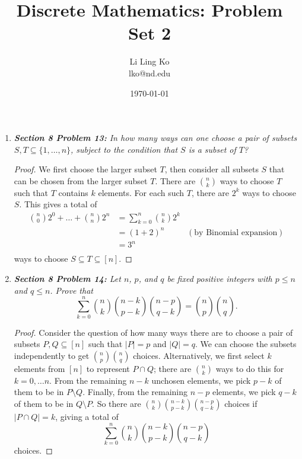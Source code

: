 \documentclass{article}
\begin{document}
\title{Discrete Mathematics: Problem Set 2}
\author{Li Ling Ko\\ lko@nd.edu}
\date{\today}
\maketitle

\begin{enumerate}[label={\bf Q\arabic*:}]
  \item \it \textbf{Section 8 Problem 13:} In how many ways can one choose
    a pair of subsets $S,T\subseteq\{1,\ldots,n\}$, subject to the
    condition that $S$ is a subset of $T$?

    \begin{proof}
      We first choose the larger subset $T$, then consider all subsets $S$
      that can be chosen from the larger subset $T$. There are
      $\binom{n}{k}$ ways to choose $T$ such that $T$ contains $k$
      elements. For each such $T$, there are $2^k$ ways to choose $S$. This
      gives a total of
      \begin{align*}
        \binom{n}{0}2^0+\ldots+\binom{n}{n}2^n
          &=\sum_{k=0}^n\binom{n}{k}2^k\\
          &=(1+2)^n &(\text{by Binomial expansion})\\
          &=3^n\\
      \end{align*}
      ways to choose $S\subseteq T\subseteq[n]$.
    \end{proof}

  \item \it \textbf{Section 8 Problem 14:} Let $n$, $p$, and $q$ be fixed
    positive integers with $p\leq n$ and $q\leq n$. Prove that
    \[\sum_{k=0}^n \binom{n}{k}\binom{n-k}{p-k}\binom{n-p}{q-k}
    =\binom{n}{p}\binom{n}{q}.\]

    \begin{proof}
      Consider the question of how many ways there are to choose a pair of
      subsets $P,Q\subseteq[n]$ such that $|P|=p$ and $|Q|=q$. We can
      choose the subsets independently to get $\binom{n}{p}\binom{n}{q}$
      choices. Alternatively, we first select $k$ elements from $[n]$ to
      represent $P\cap Q$; there are $\binom{n}{k}$ ways to do this for
      $k=0,\ldots n$. From the remaining $n-k$ unchosen elements, we pick
      $p-k$ of them to be in $P\setminus Q$. Finally, from the remaining
      $n-p$ elements, we pick $q-k$ of them to be in $Q\setminus P$. So
      there are $\binom{n}{k}\binom{n-k}{p-k}\binom{n-p}{q-k}$ choices
      if $|P\cap Q|=k$, giving a total of 
      \[\sum_{k=0}^n \binom{n}{k}\binom{n-k}{p-k}\binom{n-p}{q-k}\]
      choices.
    \end{proof}


\end{enumerate}
\end{document}
